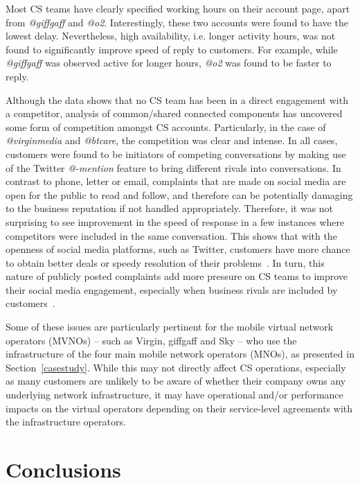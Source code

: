 \documentclass[sigconf]{acmart}
\begin{document}
{Most CS teams have clearly specified working hours on their account
page, apart from {\emph{@giffgaff}} and {\emph{@o2}}. Interestingly,
these two accounts were found to have the lowest delay. Nevertheless,
high availability, i.e. longer activity hours, was not found to
significantly improve speed of reply to customers. For example, while
{\emph{@giffgaff}} was observed active for longer hours, {\emph{@o2}}
was found to be faster to reply.

Although the data shows that no CS team has been in a direct
engagement with a competitor, analysis of common/shared connected
components has uncovered some form of competition amongst CS
accounts. Particularly, in the case of {\emph{@virginmedia}} and
{\emph{@btcare}}, the competition was clear and intense. In all cases,
customers were found to be initiators of competing conversations by
making use of the Twitter {\emph{@-mention}} feature to bring
different rivals into conversations. In contrast to phone, letter or
email, complaints that are made on social media are open for the
public to read and follow, and therefore can be potentially damaging
to the business reputation if not handled appropriately. Therefore, it
was not surprising to see improvement in the speed of response in a
few instances where competitors were included in the same
conversation. This shows that with the openness of social media
platforms, such as Twitter, customers have more chance to obtain
better deals or speedy resolution of their
problems~\cite{einwiller+steilen:2015}. In turn, this nature of
publicly posted complaints add more pressure on CS teams to improve
their social media engagement, especially when business rivals are
included by customers~\cite{gregoire-et-al:2015}. 

Some of these issues are particularly pertinent for the mobile virtual
network operators (MVNOs) -- such as Virgin, giffgaff and Sky -- who
use the infrastructure of the four main mobile network operators
(MNOs), as presented in Section~\ref{casestudy}. While this may not
directly affect CS operations, especially as many customers are
unlikely to be aware of whether their company owns any underlying
network infrastructure, it may have operational and/or performance
impacts on the virtual operators depending on their service-level
agreements with the infrastructure operators.

\section{Conclusions}\label{conclusions}

}
\end{document}
